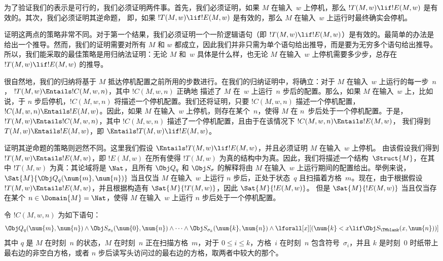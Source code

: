 \documentclass[../../../include/open-logic-section]{subfiles}
\begin{document}


\begin{explain}
为了验证我们的表示是可行的，我们必须证明两件事。首先，我们必须证明，如果 $M$ 在输入~$w$ 上停机，那么
$!T(M, w) \lif !E(M, w)$ 是有效的。其次，我们必须证明其逆命题，
即，如果 $!T(M, w) \lif !E(M, w)$ 是有效的，那么 $M$ 在输入~$w$ 上运行时最终确实会停机。

证明这两点的策略非常不同。对于第一个结果，我们必须证明一个一阶逻辑语句（即
$!T(M, w) \lif !E(M, w)$）是有效的。最简单的办法是给出一个推导。然而，我们的证明需要对所有
$M$ 和 $w$ 都成立，因此我们并非只需为单个语句给出推导，而是要为无穷多个语句给出推导。
所以，我们能采取的最佳策略是用归纳法证明：无论 $M$ 和~$w$ 具体是什么样，也无论 $M$ 在输入~$w$ 上停机需要多少步，总存在 $!T(M, w) \lif !E(M, w)$ 的推导。

很自然地，我们的归纳将基于 $M$ 抵达停机配置之前所用的步数进行。在我们的归纳证明中，将确立：对于 $M$ 在输入~$w$ 上运行的每一步~$n$，
$!T(M, w) \Entails !C(M, w, n)$，其中 $!C(M, w, n)$ 正确地
描述了 $M$ 在~$w$ 上运行~$n$ 步后的配置。那么，如果
$M$ 在输入~$w$ 上，比如说，于 $n$ 步后停机，$!C(M, w, n)$ 将描述一个停机配置。我们还将证明，只要 $!C(M, w, n)$ 描述一个停机配置，
$!C(M, w, n)
\Entails !E(M, w)$。因此，如果 $M$ 在输入~$w$ 上停机，则存在某个~$n$，使得 $M$
在 $n$~步后处于一个停机配置。于是，
$!T(M, w)
\Entails !C(M, w, n)$，其中 $!C(M, w, n)$ 描述了一个停机配置，且由于在该情况下
$!C(M, w, n) \Entails !E(M, w)$，
我们得到 $T(M, w) \Entails !E(M, w)$，即
$\Entails !T(M, w)
\lif !E(M, w)$。

证明其逆命题的策略则迥然不同。这里我们假设
$\Entails !T(M, w) \lif !E(M, w)$，并且必须证明 $M$ 在输入~$w$ 上停机。
由该假设我们得到 $!T(M, w) \Entails !E(M,
w)$，即 $!E(M, w)$ 在所有使得 $!T(M,
w)$ 为真的结构中为真。因此，我们将描述一个结构~$\Struct{M}$，在其中
$!T(M, w)$ 为真：其论域将是 $\Nat$，且所有 $\Obj Q_q$ 和 $\Obj S_\sigma$ 的解释将由 $M$ 在输入~$w$ 上运行期间的配置给出。举例来说，
$\Sat{M}{\Obj Q_q(\num{m}, \num{n})}$ 当且仅当 $M$ 在输入~$w$
上运行 $n$ 步后，正处于状态~$q$ 且扫描着方格~$m$。现在，由于根据假设
$!T(M, w) \Entails !E(M, w)$，并且根据构造有
$\Sat{M}{!T(M,
  w)}$，因此
$\Sat{M}{!E(M, w)}$。 但是
$\Sat{M}{!E(M, w)}$
当且仅当存在某个 $n \in \Domain{M} = \Nat$，使得 $M$ 在输入~$w$ 上运行 $n$ 步后处于一个停机配置。
\end{explain}

\begin{defn}
令 $!C(M, w, n)$ 为如下语句：
\[
\Obj Q_q(\num{m}, \num{n}) \land \Obj S_{\sigma_0}(\num{0}, \num{n})
\land \dots \land \Obj S_{\sigma_k}(\num{k}, \num{n}) \land
\lforall[x][(\num{k} < x \lif \Obj S_\TMblank(x, \num{n}))]
\]
其中 $q$ 是 $M$ 在时刻~$n$ 的状态，$M$ 在时刻~$n$ 正在扫描方格~$m$，对于 $0 \le i \le k$，方格~$i$ 在时刻~$n$ 包含符号~$\sigma_i$，并且 $k$ 是时刻~$0$ 时纸带上最右边的非空白方格，或者 $n$ 步后读写头访问过的最右边的方格，取两者中较大的那个。
\end{defn}
\end{document}
